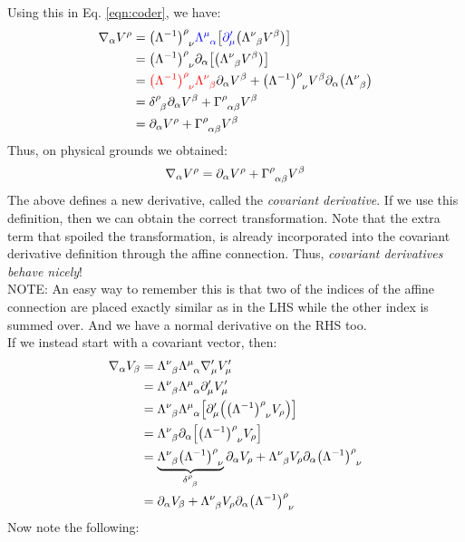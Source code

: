 Using this in Eq. \ref{eqn:coder}, we have:
\begin{align*}
    \covd{\alpha}V^\rho &= \itrmat{\rho}{\nu} \mathcolor{blue}{\trmat{\mu}{\alpha}}\qty[\mathcolor{blue}{\partial_\mu'}\qty(\trmat{\nu}{\beta}V^\beta)]\\
    &=\itrmat{\rho}{\nu} \partial_\alpha\qty[\qty(\trmat{\nu}{\beta}V^\beta)]\\
    &=\mathcolor{red}{\itrmat{\rho}{\nu}\trmat{\nu}{\beta}} \partial_\alpha V^\beta+\itrmat{\rho}{\nu} V^\beta\partial_\alpha\qty(\trmat{\nu}{\beta})\\
    &=\tensor{\delta}{^\rho _\beta}\partial_\alpha V^\beta + \chris{\rho}{\alpha}{\beta}V^\beta\\
    &=\partial_\alpha V^\rho + \chris{\rho}{\alpha}{\beta}V^\beta
\end{align*}
Thus, on physical grounds we obtained:
\begin{equation}\label{eqn:covar}
    \covd{\alpha}V^\rho = \partial_\alpha V^\rho + \chris{\rho}{\alpha}{\beta}V^\beta
\end{equation}
The above defines a new derivative, called the \textit{covariant derivative}. If we use this definition, then we can obtain the correct transformation. Note that the extra term that spoiled the transformation, is already incorporated into the covariant derivative definition through the affine connection. Thus, \textit{covariant derivatives behave nicely}!\\[0.2cm]
NOTE: An easy way to remember this is that two of the indices of the affine connection are placed exactly similar as in the LHS while the other index is summed over. And we have a normal derivative on the RHS too. \\[0.2cm]
If we instead start with a covariant vector, then:
\begin{align*}
    \covd{\alpha}V_\beta &=\trmat{\nu}{\beta}\trmat{\mu}{\alpha}\covd{\mu}'V'_{\mu}\\
    &=\trmat{\nu}{\beta}\trmat{\mu}{\alpha}\partial_\mu'V'_{\mu}\\
    &=\trmat{\nu}{\beta}\trmat{\mu}{\alpha}\qty[\partial_\mu'\qty(\itrmat{\rho}{\nu}V_\rho)]\\
    &=\trmat{\nu}{\beta}\partial_\alpha\qty[\itrmat{\rho}{\nu}V_\rho]\\
    &=\underbrace{\trmat{\nu}{\beta}\itrmat{\rho}{\nu}}_{\tensor{\delta}{^\rho _\beta}}\partial_\alpha V_\rho+\trmat{\nu}{\beta}V_\rho\partial_\alpha\itrmat{\rho}{\nu}\\
    &=\partial_\alpha V_\beta + \trmat{\nu}{\beta}V_\rho\partial_\alpha\itrmat{\rho}{\nu}
\end{align*}
Now note the following:

